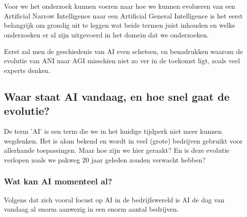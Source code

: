 \chapter{}
\label{ch:stand-van-zaken}



Voor we het onderzoek kunnen voeren naar hoe we kunnen evolueren van een Artificial Narrow Intelligence naar een Artificial General Intelligence is het eerst belangrijk om grondig uit te leggen wat beide termen juist inhouden en welke onderzoeken er al zijn uitgevoerd in het domein dat we onderzoeken.

Eerst zal men de geschiedenis van AI even schetsen, en benadrukken waarom de evolutie van ANI naar AGI misschien niet zo ver in de toekomst ligt, zoals veel experts denken.

\section{Waar staat AI vandaag, en hoe snel gaat de evolutie?}
De term 'AI' is een term die we in het huidige tijdperk niet meer kunnen wegdenken. Het is alom bekend en wordt in veel (grote) bedrijven gebruikt voor allerhande toepassingen. Maar hoe zijn we hier geraakt? En is deze evolutie verlopen zoals we pakweg 20 jaar geleden zouden verwacht hebben?

\subsection{Wat kan AI momenteel al?}
Volgens \cite{brynjolfsson2017artificial} dat zich vooral focust op AI in de bedrijfswereld is AI de dag van vandaag al enorm aanwezig in een enorm aantal bedrijven.



